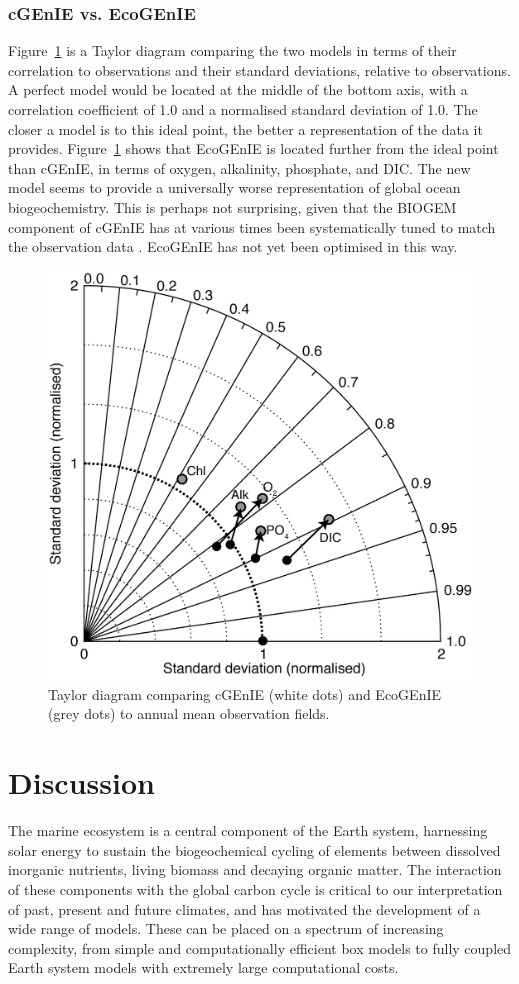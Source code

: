 \documentclass[gmd, manuscript]{copernicus}
\begin{document}
{\clearpage
\subsubsection{cGEnIE vs. EcoGEnIE}

Figure~\ref{fig:taylor} is a Taylor diagram comparing the two models in terms of their correlation to observations and their standard deviations, relative to observations. A perfect model would be located at the middle of the bottom axis, with a correlation coefficient of 1.0 and a normalised standard deviation of 1.0. The closer a model is to this ideal point, the better a representation of the data it provides. Figure~\ref{fig:taylor} shows that EcoGEnIE is located further from the ideal point than cGEnIE, in terms of oxygen, alkalinity, phosphate, and DIC. The new model seems to provide a universally worse representation of global ocean biogeochemistry. This is perhaps not surprising, given that the BIOGEM component of cGEnIE has at various times been systematically tuned to match the observation data \citep[e.g.][]{Ridgwell:2007,Ridgwell:prep}. EcoGEnIE has not yet been optimised in this way.

\begin{figure}[htbp]
\begin{center}
\includegraphics[width=0.5\linewidth]{Final_figures/Fig_19.png}
\caption{Taylor diagram comparing cGEnIE (white dots) and EcoGEnIE (grey dots) to annual mean observation fields.}
\label{fig:taylor}
\end{center}
\end{figure}

\clearpage
\section{Discussion}

The marine ecosystem is a central component of the Earth system, harnessing solar energy to sustain the biogeochemical cycling of elements between dissolved inorganic nutrients, living biomass and decaying organic matter. The interaction of these components with the global carbon cycle is critical to our interpretation of past, present and future climates, and has motivated the development of a wide range of models. These can be placed on a spectrum of increasing complexity, from simple and computationally efficient box models to fully coupled Earth system models with extremely large computational costs. 

}
\end{document}
